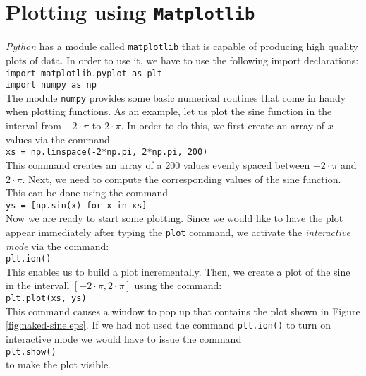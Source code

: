 \documentclass{report}
\begin{document}
\chapter{Plotting using \texttt{Matplotlib}}
\textsl{Python} has a module called \texttt{matplotlib} that is capable of producing high quality
plots of data.  In order to use it, we have to use the following import declarations:
\\[0.2cm]
\hspace*{1.3cm}
\texttt{import matplotlib.pyplot as plt} \\
\hspace*{1.3cm}
\texttt{import numpy as np}
\\[0.2cm]
The module \texttt{numpy} provides some basic numerical routines that come in handy when plotting
functions.  As an example, let us plot the sine function in the interval from $-2\cdot\pi$ to $2\cdot\pi$.  In
order to do this, we first create an array of $x$-values via the command
\\[0.2cm]
\hspace*{1.3cm}
\texttt{xs = np.linspace(-2*np.pi, 2*np.pi, 200)}
\\[0.2cm]
This command creates an array of a 200 values evenly spaced between $-2\cdot\pi$ and $2\cdot\pi$.  Next, we
need to compute the corresponding values of the sine function.  This can be done using the command
\\[0.2cm]
\hspace*{1.3cm}
\texttt{ys = [np.sin(x) for x in xs]}
\\[0.2cm]
Now we are ready to start some plotting.  Since we would like to have the plot appear immediately
after typing the \texttt{plot} command, we activate the \emph{interactive mode} via the command:
\\[0.2cm]
\hspace*{1.3cm}
\texttt{plt.ion()}
\\[0.2cm]
This enables us to build a plot incrementally. Then, we create a plot of the sine in the intervall
$[-2\cdot \pi, 2\cdot\pi]$ using the command:
\\[0.2cm]
\hspace*{1.3cm}
\texttt{plt.plot(xs, ys)}
\\[0.2cm]
This command causes a window to pop up that contains the plot shown in Figure
\ref{fig:naked-sine.eps}.  If we had not used the command \texttt{plt.ion()} to turn on interactive
mode we would have to issue the command
\\[0.2cm]
\hspace*{1.3cm}
\texttt{plt.show()}
\\[0.2cm]
to make the plot visible.
\end{document}
